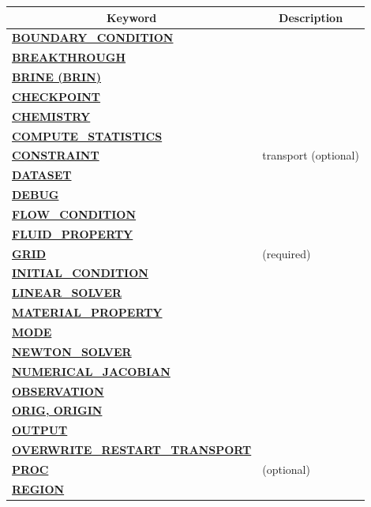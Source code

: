 \documentclass[12pt]{article}
\begin{document}
\begin{longtable}{ll}%


\toprule[1.5pt]
\multicolumn{1}{c}{\bf Keyword} & \multicolumn{1}{c}{\bf Description}\\
\midrule[1pt]
\hyperlink{target_bcon}{\bf BOUNDARY\_CONDITION} & \\
\hyperlink{target_brk}{\bf BREAKTHROUGH} & \\
\hyperlink{target_brine}{\bf BRINE (BRIN)} & \\
\hyperlink{target_ckpt}{\bf CHECKPOINT} & \\
\hyperlink{target_chem}{\bf CHEMISTRY} & \\
\hyperlink{target_stat}{\bf COMPUTE\_STATISTICS} & \\
\hyperlink{target_constraint}{\bf CONSTRAINT} & transport (optional)\\
\hyperlink{target_datset}{\bf DATASET} & \\
\hyperlink{target_dbg}{\bf DEBUG} & \\
\hyperlink{target_flow_cond}{\bf FLOW\_CONDITION} & \\
\hyperlink{target_fluid_property}{\bf FLUID\_PROPERTY} & \\
\hyperlink{target_grid}{\bf GRID} & (required)\\
\hyperlink{target_init}{\bf INITIAL\_CONDITION} & \\
\hyperlink{target_linsolv}{\bf LINEAR\_SOLVER} & \\
\hyperlink{target_mat}{\bf MATERIAL\_PROPERTY} & \\
\hyperlink{target_mode}{\bf MODE} & \\
\hyperlink{target_newt}{\bf NEWTON\_SOLVER} & \\
\hyperlink{target_numjac}{\bf NUMERICAL\_JACOBIAN} & \\
\hyperlink{target_observation}{\bf OBSERVATION} & \\
\hyperlink{target_orig}{\bf ORIG, ORIGIN} & \\
\hyperlink{target_output}{\bf OUTPUT} & \\
\hyperlink{target_overwrite}{\bf OVERWRITE\_RESTART\_TRANSPORT} & \\
\hyperlink{target_proc}{\bf PROC} & (optional)\\
\hyperlink{target_region}{\bf REGION} & \\

\end{longtable}
\end{document}
